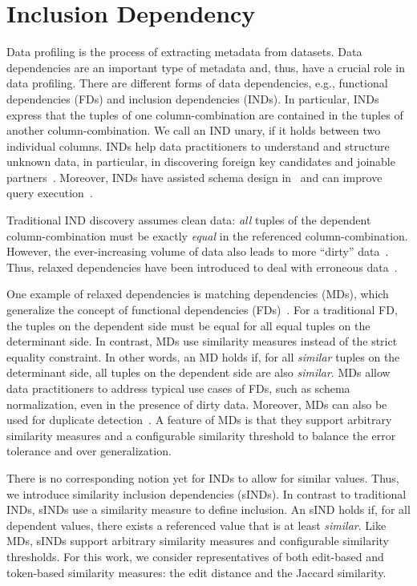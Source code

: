 \section{Inclusion Dependency}
\label{section:introduction}

Data profiling is the process of extracting metadata from datasets.
Data dependencies are an important type of metadata and, thus, have a crucial role in data profiling.
There are different forms of data dependencies, e.g., functional dependencies (FDs) and inclusion dependencies (INDs).
In particular, INDs express that the tuples of one column-combination are contained in the tuples of another column-combination. We call an IND unary, if it holds between two individual columns.
INDs help data practitioners to understand and structure unknown data, in particular, in discovering foreign key candidates and joinable partners~\cite{miller2001clio}.
Moreover, INDs have assisted schema design in~\cite{levene2000INDNF} and can improve query execution~\cite{gryz1998query}.

Traditional IND discovery assumes clean data: \emph{all} tuples of the dependent column-combination must be exactly \emph{equal} in the referenced column-combination.
However, the ever-increasing volume of data also leads to more ``dirty'' data~\cite{marsh2005dirty}.
Thus, relaxed dependencies have been introduced to deal with erroneous data~\cite{caruccio2016relaxed}.

One example of relaxed dependencies is matching dependencies (MDs), which generalize the concept of functional dependencies (FDs)~\cite{MDDiscovery}.
For a traditional FD, the tuples on the dependent side must be equal for all equal tuples on the determinant side.
In contrast, MDs use similarity measures instead of the strict equality constraint.
In other words, an MD holds if, for all \emph{similar} tuples on the determinant side, all tuples on the dependent side are also \emph{similar}.
MDs allow data practitioners to address typical use cases of FDs, such as schema normalization, even in the presence of dirty data.
Moreover, MDs can also be used for duplicate detection~\cite{MDDiscovery}.
A feature of MDs is that they support arbitrary similarity measures and a configurable similarity threshold to balance the error tolerance and over generalization.

There is no corresponding notion yet for INDs to allow for similar values.
Thus, we introduce similarity inclusion dependencies (sINDs).
In contrast to traditional INDs, sINDs use a similarity measure to define inclusion.
An sIND holds if, for all dependent values, there exists a referenced value that is at least \emph{similar}. Like MDs, sINDs support arbitrary similarity measures and configurable similarity thresholds. For this work, we consider representatives of both edit-based and token-based similarity measures: the edit distance and the Jaccard similarity.

